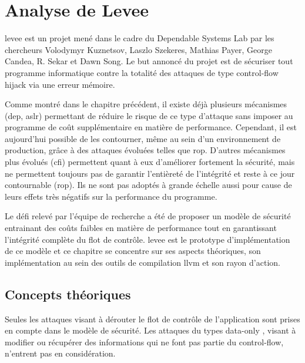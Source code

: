 \chapter{Analyse de Levee}
\label{chap:levee}


\gls{levee} est un projet mené dans le cadre du Dependable Systems Lab \cite{dslab} par les chercheurs Volodymyr Kuznetsov, Laszlo Szekeres, Mathias Payer, George Candea, R. Sekar et Dawn Song. Le but annoncé du projet est de sécuriser tout programme informatique contre la totalité des attaques de type \og control-flow hijack \fg via une erreur mémoire.

Comme montré dans le chapitre précédent, il existe déjà plusieurs mécanismes (\gls{dep}, \gls{aslr}) permettant de réduire le risque de ce type d'attaque sans imposer au programme de coût supplémentaire en matière de performance. Cependant, il est aujourd'hui possible de les contourner, même au sein d'un environnement de production, grâce à des attaques évoluées telles que \gls{rop}. D'autres mécanismes plus évolués (\gls{cfi}) permettent quant à eux d'améliorer fortement la sécurité, mais ne permettent toujours pas de garantir l'entièreté de l'intégrité et reste à ce jour contournable (\gls{rop}). Ils ne sont pas adoptés à grande échelle aussi pour cause de leurs effets très négatifs sur la performance du programme.

Le défi relevé par l'équipe de recherche a été de proposer un modèle de sécurité entrainant des coûts faibles en matière de performance tout en garantissant l'intégrité complète du flot de contrôle. \gls{levee} est le prototype d'implémentation de ce modèle et ce chapitre se concentre sur ses aspects théoriques, son implémentation au sein des outils de compilation \gls{llvm} et son rayon d'action.

\minitoc

\newpage

\section{Concepts théoriques}

Seules les attaques visant à dérouter le flot de contrôle de l'application sont prises en compte dans le modèle de sécurité. Les attaques du types \og data-only \fg, visant à modifier ou récupérer des informations qui ne font pas partie du control-flow, n'entrent pas en considération.


